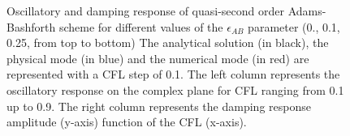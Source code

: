 \begin{figure}
\begin{center}
\end{center}
\caption{
Oscillatory and damping response of
quasi-second order Adams-Bashforth scheme for different values
of the $\epsilon_{AB}$ parameter (0., 0.1, 0.25, from top to bottom)
The analytical solution (in black), the physical mode (in blue)
and the numerical mode (in red) are represented with a CFL
step of 0.1.
The left column represents the oscillatory response
on the complex plane for CFL ranging from 0.1 up to 0.9.
The right column represents the damping response amplitude
(y-axis) function of the CFL (x-axis).
}
\label{fig:adams-bashforth-respons}
\end{figure}



